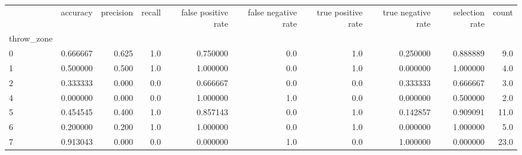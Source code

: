 \begin{tabular}{lrrrrrrrrr}
\toprule
{} &  accuracy &  precision &  recall &  false positive rate &  false negative rate &  true positive rate &  true negative rate &  selection rate &  count \\
throw\_zone &           &            &         &                      &                      &                     &                     &                 &        \\
\midrule
0          &  0.666667 &      0.625 &     1.0 &             0.750000 &                  0.0 &                 1.0 &            0.250000 &        0.888889 &    9.0 \\
1          &  0.500000 &      0.500 &     1.0 &             1.000000 &                  0.0 &                 1.0 &            0.000000 &        1.000000 &    4.0 \\
2          &  0.333333 &      0.000 &     0.0 &             0.666667 &                  0.0 &                 0.0 &            0.333333 &        0.666667 &    3.0 \\
4          &  0.000000 &      0.000 &     0.0 &             1.000000 &                  1.0 &                 0.0 &            0.000000 &        0.500000 &    2.0 \\
5          &  0.454545 &      0.400 &     1.0 &             0.857143 &                  0.0 &                 1.0 &            0.142857 &        0.909091 &   11.0 \\
6          &  0.200000 &      0.200 &     1.0 &             1.000000 &                  0.0 &                 1.0 &            0.000000 &        1.000000 &    5.0 \\
7          &  0.913043 &      0.000 &     0.0 &             0.000000 &                  1.0 &                 0.0 &            1.000000 &        0.000000 &   23.0 \\
\bottomrule
\end{tabular}

